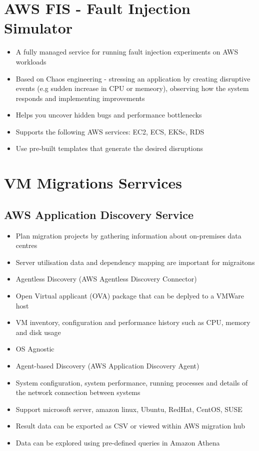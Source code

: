 {{\section{AWS FIS - Fault Injection Simulator}
\begin{itemize}
    \item A fully managed service for running fault injection experiments on AWS workloads
    \item Based on Chaos engineering - stressing an application by creating disruptive events (e.g sudden increase in CPU or memeory), observing how the system responds and implementing improvements
    \item Helps you uncover hidden bugs and performance bottlenecks
    \item Supports the following AWS services: EC2, ECS, EKSc, RDS
    \item Use pre-built templates that generate the desired disruptions
\end{itemize}


\section{VM Migrations Serrvices}

\subsection{AWS Application Discovery Service}
\begin{itemize}
    \item Plan migration projects by gathering information about on-premises data centres
    \item Server utilisation data and dependency mapping are important for migraitons
    \item Agentless Discovery (AWS Agentless Discovery Connector)
    \item Open Virtual applicant (OVA) package that can be deplyed to a VMWare host
    \item VM inventory, configuration and performance history such as CPU, memory and disk usage
    \item OS Agnostic
    \item Agent-based Discovery (AWS Application Discovery Agent)
    \item System configuration, system performance, running processes and details of the network connection between systems
    \item Support microsoft server, amazon linux, Ubuntu, RedHat, CentOS, SUSE
    \item Result data can be exported as CSV or viewed within AWS migration hub
    \item Data can be explored using pre-defined queries in Amazon Athena
\end{itemize}

}}

